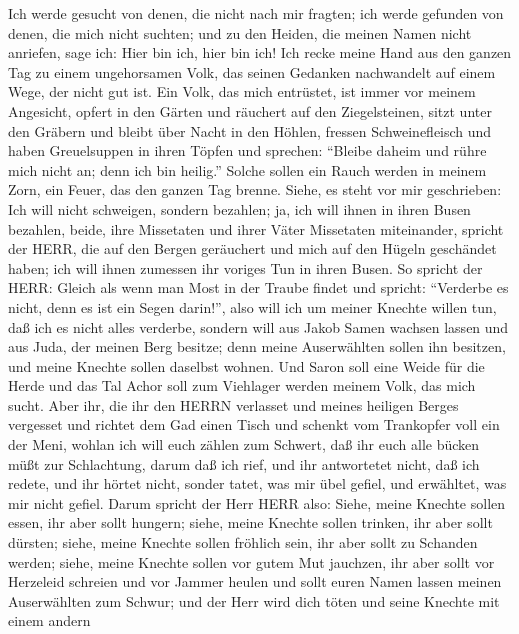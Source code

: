  Ich werde gesucht von denen, die nicht nach mir fragten;
ich werde gefunden von denen, die mich nicht suchten; und zu den Heiden,
die meinen Namen nicht anriefen, sage ich: Hier bin ich, hier bin ich!
 Ich recke meine Hand aus den ganzen Tag zu einem
ungehorsamen Volk, das seinen Gedanken nachwandelt auf einem Wege, der
nicht gut ist.  Ein Volk, das mich entrüstet, ist immer vor
meinem Angesicht, opfert in den Gärten und räuchert auf den
Ziegelsteinen,  sitzt unter den Gräbern und bleibt über
Nacht in den Höhlen, fressen Schweinefleisch und haben Greuelsuppen in
ihren Töpfen  und sprechen: ``Bleibe daheim und rühre mich
nicht an; denn ich bin heilig.'' Solche sollen ein Rauch werden in
meinem Zorn, ein Feuer, das den ganzen Tag brenne.  Siehe,
es steht vor mir geschrieben: Ich will nicht schweigen, sondern
bezahlen; ja, ich will ihnen in ihren Busen bezahlen, 
beide, ihre Missetaten und ihrer Väter Missetaten miteinander, spricht
der HERR, die auf den Bergen geräuchert und mich auf den Hügeln
geschändet haben; ich will ihnen zumessen ihr voriges Tun in ihren
Busen.  So spricht der HERR: Gleich als wenn man Most in der
Traube findet und spricht: ``Verderbe es nicht, denn es ist ein Segen
darin!'', also will ich um meiner Knechte willen tun, daß ich es nicht
alles verderbe,  sondern will aus Jakob Samen wachsen lassen
und aus Juda, der meinen Berg besitze; denn meine Auserwählten sollen
ihn besitzen, und meine Knechte sollen daselbst wohnen. 
Und Saron soll eine Weide für die Herde und das Tal Achor soll zum
Viehlager werden meinem Volk, das mich sucht.  Aber ihr,
die ihr den HERRN verlasset und meines heiligen Berges vergesset und
richtet dem Gad einen Tisch und schenkt vom Trankopfer voll ein der
Meni,  wohlan ich will euch zählen zum Schwert, daß ihr
euch alle bücken müßt zur Schlachtung, darum daß ich rief, und ihr
antwortetet nicht, daß ich redete, und ihr hörtet nicht, sonder tatet,
was mir übel gefiel, und erwähltet, was mir nicht gefiel. 
Darum spricht der Herr HERR also: Siehe, meine Knechte sollen essen, ihr
aber sollt hungern; siehe, meine Knechte sollen trinken, ihr aber sollt
dürsten; siehe, meine Knechte sollen fröhlich sein, ihr aber sollt zu
Schanden werden;  siehe, meine Knechte sollen vor gutem Mut
jauchzen, ihr aber sollt vor Herzeleid schreien und vor Jammer heulen
 und sollt euren Namen lassen meinen Auserwählten zum
Schwur; und der Herr wird dich töten und seine Knechte mit einem andern
